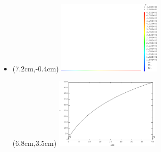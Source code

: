 \begin{frame}{}
  \begin{itemize}
    \item {}
    \begin{textblock*}{6cm}(7.2cm,-0.4cm)
      \includegraphics[width=5cm]{images/thermique_1d_axi.1}
    \end{textblock*}
    \begin{textblock*}{6cm}(6.8cm,3.5cm)
      \includegraphics[width=5cm]{images/thermique_1d_axi.2}
    \end{textblock*}
    
  \end{itemize}
  \vspace{1cm}
\end{frame}

